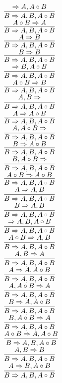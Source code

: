 \documentclass[11pt]{article}
\begin{document}
\begin{center}
\bigskip
\\$\infer{B\Rightarrow A, B, A\circ B}{\Rightarrow A, A\circ B}$
\bigskip
\\$\infer{B\Rightarrow A, B, A\circ B}{A\circ B\Rightarrow A}$
\bigskip
\\$\infer{B\Rightarrow A, B, A\circ B}{A\Rightarrow B}$
\bigskip
\\$\infer{B\Rightarrow A, B, A\circ B}{B\Rightarrow B}$
\bigskip
\\$\infer{B\Rightarrow A, B, A\circ B}{\Rightarrow B, A\circ B}$
\bigskip
\\$\infer{B\Rightarrow A, B, A\circ B}{A\circ B\Rightarrow B}$
\bigskip
\\$\infer{B\Rightarrow A, B, A\circ B}{A, B\Rightarrow }$
\bigskip
\\$\infer{B\Rightarrow A, B, A\circ B}{A\Rightarrow A\circ B}$
\bigskip
\\$\infer{B\Rightarrow A, B, A\circ B}{A, A\circ B\Rightarrow }$
\bigskip
\\$\infer{B\Rightarrow A, B, A\circ B}{B\Rightarrow A\circ B}$
\bigskip
\\$\infer{B\Rightarrow A, B, A\circ B}{B, A\circ B\Rightarrow }$
\bigskip
\\$\infer{B\Rightarrow A, B, A\circ B}{A\circ B\Rightarrow A\circ B}$
\bigskip
\\$\infer{B\Rightarrow A, B, A\circ B}{A\Rightarrow A, B}$
\bigskip
\\$\infer{B\Rightarrow A, B, A\circ B}{B\Rightarrow A, B}$
\bigskip
\\$\infer{B\Rightarrow A, B, A\circ B}{\Rightarrow A, B, A\circ B}$
\bigskip
\\$\infer{B\Rightarrow A, B, A\circ B}{A\circ B\Rightarrow A, B}$
\bigskip
\\$\infer{B\Rightarrow A, B, A\circ B}{A, B\Rightarrow A}$
\bigskip
\\$\infer{B\Rightarrow A, B, A\circ B}{A\Rightarrow A, A\circ B}$
\bigskip
\\$\infer{B\Rightarrow A, B, A\circ B}{A, A\circ B\Rightarrow A}$
\bigskip
\\$\infer{B\Rightarrow A, B, A\circ B}{B\Rightarrow A, A\circ B}$
\bigskip
\\$\infer{B\Rightarrow A, B, A\circ B}{B, A\circ B\Rightarrow A}$
\bigskip
\\$\infer{B\Rightarrow A, B, A\circ B}{A\circ B\Rightarrow A, A\circ B}$
\bigskip
\\$\infer{B\Rightarrow A, B, A\circ B}{A, B\Rightarrow B}$
\bigskip
\\$\infer{B\Rightarrow A, B, A\circ B}{A\Rightarrow B, A\circ B}$

\end{center}
\end{document}

